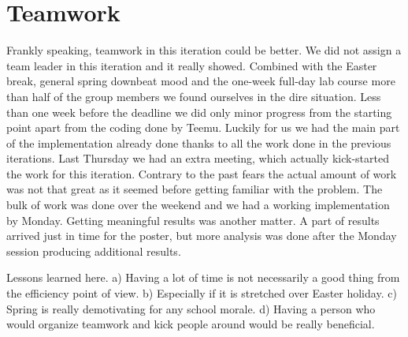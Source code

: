 \section{Teamwork}

Frankly speaking, teamwork in this iteration could be better. We did not assign a team leader in this iteration and it really showed. Combined with the Easter break, general spring downbeat mood and the one-week full-day lab course more than half of the group members we found ourselves in the dire situation. Less than one week before the deadline we did only minor progress from the starting point apart from the coding done by Teemu. Luckily for us we had the main part of the implementation already done thanks to all the work done in the previous iterations. Last Thursday we had an extra meeting, which actually kick-started the work for this iteration. Contrary to the past fears the actual amount of work was not that great as it seemed before getting familiar with the problem. The bulk of work was done over the weekend and we had a working implementation by Monday. Getting meaningful results was another matter. A part of results arrived just in time for the poster, but more analysis was done after the Monday session producing additional results.

Lessons learned here. a) Having a lot of time is not necessarily a good thing from the efficiency point of view. b) Especially if it is stretched over Easter holiday. c) Spring is really demotivating for any school morale. d) Having a person who would organize teamwork and kick people around would be really beneficial.